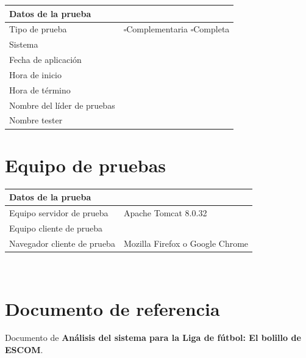 \documentclass[oneside,10pt]{book}
\begin{document}
\begin{tabularx}{\textwidth}{ l X }
\hline
\multicolumn{1}{l}{\cellcolor[HTML]{CBCEFB}Datos de la prueba} & \multicolumn{1}{X}{\cellcolor[HTML]{CBCEFB} }     \\ \hline
\multicolumn{1}{|l|}{Tipo de prueba}   & \multicolumn{1}{X|}{ $\square$Complementaria $\square$Completa} \\ \hline
\multicolumn{1}{|l|}{Sistema}   & \multicolumn{1}{X|}{ } \\ \hline
\multicolumn{1}{|l|}{Fecha de aplicación}   & \multicolumn{1}{X|}{ } \\ \hline
\multicolumn{1}{|l|}{Hora de inicio}   & \multicolumn{1}{X|}{ } \\ \hline
\multicolumn{1}{|l|}{Hora de término}   & \multicolumn{1}{X|}{ } \\ \hline
\multicolumn{1}{|l|}{Nombre del líder de pruebas}   & \multicolumn{1}{X|}{ } \\ \hline
\multicolumn{1}{|l|}{Nombre tester}   & \multicolumn{1}{X|}{ } \\ \hline
\end{tabularx}

\section{Equipo de pruebas}

\begin{tabularx}{\textwidth}{ l X }
\hline
\multicolumn{1}{l}{\cellcolor[HTML]{CBCEFB}Datos de la prueba} & \multicolumn{1}{X}{\cellcolor[HTML]{CBCEFB} }     \\ \hline
\multicolumn{1}{|l|}{Equipo servidor de prueba}   & \multicolumn{1}{X|}{ Apache Tomcat 8.0.32 } \\ \hline
\multicolumn{1}{|l|}{Equipo cliente de prueba}   & \multicolumn{1}{X|}{ } \\ \hline
\multicolumn{1}{|l|}{Navegador cliente de prueba}   & \multicolumn{1}{X|}{ Mozilla Firefox o Google Chrome} \\ \hline
\end{tabularx}
\\
\section{Documento de referencia}

Documento de \textbf{Análisis del sistema para la Liga de fútbol: El bolillo de ESCOM}. \\
\end{document}
